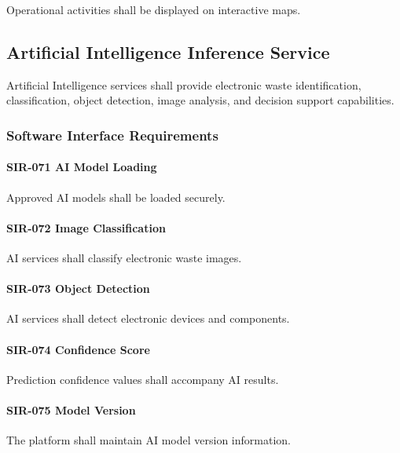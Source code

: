 Operational activities shall be displayed on interactive maps.


\subsection{Artificial Intelligence Inference Service}

Artificial Intelligence services shall provide electronic waste
identification, classification, object detection, image analysis, and
decision support capabilities.


\subsubsection*{Software Interface Requirements}

\paragraph{SIR-071 AI Model Loading}

Approved AI models shall be loaded securely.

\paragraph{SIR-072 Image Classification}

AI services shall classify electronic waste images.

\paragraph{SIR-073 Object Detection}

AI services shall detect electronic devices and components.

\paragraph{SIR-074 Confidence Score}

Prediction confidence values shall accompany AI results.

\paragraph{SIR-075 Model Version}

The platform shall maintain AI model version information.

